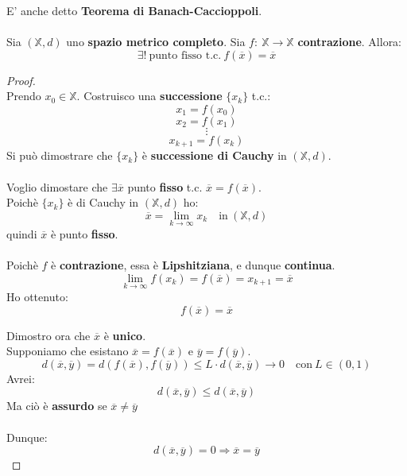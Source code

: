 \documentclass[a4paper, oneside]{article}
\newcommand\X{\mathbb{X}}
\begin{document}
\begin{theorem}
    E' anche detto \textbf{Teorema di Banach-Caccioppoli}.\\\\
    \noindent Sia $(\X,d)$ uno \textbf{spazio metrico completo}. Sia $f: \ \X\to\X$ \textbf{contrazione}. Allora:
    \[\exists! \ \text{punto fisso t.c.} \ f(\overline{x}) = \overline{x}\]

    \begin{proof}\hfill\\
        Prendo $x_0\in\X$. Costruisco una \textbf{successione} $\{x_k\}$ t.c.: 
        \[x_1 = f(x_0)\]
        \[x_2 = f(x_1)\]
        \[\vdots\]
        \[x_{k+1} = f(x_k)\]
        Si può dimostrare che $\{x_k\}$ è \textbf{successione di Cauchy} in $(\X,d)$.\\\\
        Voglio dimostare che $\exists\overline{x}$ punto \textbf{fisso} t.c. $\overline{x} = f(\overline{x})$.\\
        Poichè $\{x_k\}$ è di Cauchy in $(\X,d)$ ho:
        \[\overline{x} = \lim_{k\to\infty} x_k \quad\text{in} \ (\X,d)\]
        quindi $\overline{x}$ è punto \textbf{fisso}.\\\\
        Poichè $f$ è \textbf{contrazione}, essa è \textbf{Lipshitziana}, e dunque \textbf{continua}.
        \[\lim_{k\to\infty} f(x_k) = f(\overline{x}) = x_{k+1} = \overline{x}\]
        Ho ottenuto:
        \[f(\overline{x}) = \overline{x}\]

        \newpage
        
        \noindent Dimostro ora che $\overline{x}$ è \textbf{unico}.\\
        Supponiamo che esistano $\overline{x} = f(\overline{x})$ e $\overline{y} = f(\overline{y})$.
        \[d(\overline{x},\overline{y}) = d\left(f(\overline{x}),f(\overline{y})\right) \leq L\cdot d(\overline{x},\overline{y})\to 0 \quad\text{con} \ L\in(0,1)\]
        Avrei:
        \[d(\overline{x},\overline{y}) \leq d(\overline{x},\overline{y})\]
        Ma ciò è \textbf{assurdo} se $\overline{x}\ne \overline{y}$\\\\
        Dunque:
        \[d(\overline{x},\overline{y}) = 0 \Rightarrow \overline{x} = \overline{y}\]
    \end{proof}
\end{theorem}
\end{document}
